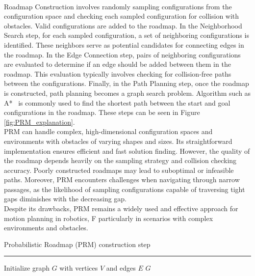 \documentclass{ctuthesis}
\begin{document}
\\
Roadmap Construction involves randomly sampling configurations from the configuration space and 
checking each sampled configuration for collision with obstacles. 
Valid configurations are added to the roadmap.
In the Neighborhood Search step, for each sampled configuration, 
a set of neighboring configurations is identified. 
These neighbors serve as potential candidates for connecting edges in the roadmap.
In the Edge Connection step, 
pairs of neighboring configurations are evaluated to determine 
if an edge should be added between them in the roadmap. 
This evaluation typically involves checking for collision-free paths between the configurations.
Finally, in the Path Planning step, once the roadmap is constructed, 
path planning becomes a graph search problem. 
Algorithm such as A*~\cite{Hart1968Astar} is commonly used to find the shortest path 
between the start and goal configurations in the roadmap.
These steps can be seen in Figure \ref{fig:PRM_explanation}.
\\[12pt]
PRM can handle complex, high-dimensional configuration spaces and 
environments with obstacles of varying shapes and sizes.
Its straightforward implementation ensures efficient and fast solution finding.
However, the quality of the roadmap depends heavily on the sampling strategy and 
collision checking accuracy. 
Poorly constructed roadmaps may lead to suboptimal or infeasible paths.
Moreover, PRM encounters challenges when navigating through narrow passages, 
as the likelihood of sampling configurations capable of traversing tight gaps diminishes 
with the decreasing gap.\\[12pt]
Despite its drawbacks, 
PRM remains a widely used and effective approach for motion planning in robotics, F
particularly in scenarios with complex environments and obstacles.\\

\begin{algorithm}[H]
  \caption{Probabilistic Roadmap (PRM) construction step}
  \label{alg:prm_constraction} 
  \vspace{0.1cm}
  \hrule
  \vspace{0.2cm}
  Initialize graph $G$ with vertices $V$ and edges $E$\;
  \Return $G$\;
\end{algorithm}
\end{document}
